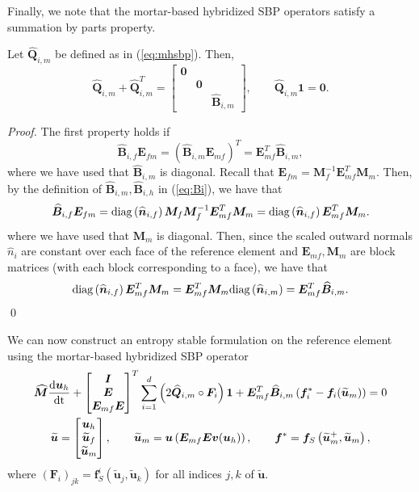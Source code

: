 \documentclass{svjour3}                     %
\renewcommand{\hat}{\widehat}
\renewcommand{\tilde}{\widetilde}
\newcommand{\diag}[1]{{\rm diag}\LRp{#1}}
\newcommand{\td}[2]{\frac{{\rm d}#1}{{\rm d}{\rm #2}}}
\newcommand{\LRp}[1]{\left( #1 \right)}
\begin{document}
Finally, we note that the mortar-based hybridized SBP operators satisfy a summation by parts property.
\begin{lemma}
\label{lemma:mhsbp}
Let $\hat{\bm{Q}}_{i,m}$ be defined as in (\ref{eq:mhsbp}).  Then, 
\[
\hat{\bm{Q}}_{i,m} + \hat{\bm{Q}}_{i,m}^T = \begin{bmatrix}
\bm{0} && \\
&\bm{0} &\\
&& \hat{\bm{B}}_{i,m}\end{bmatrix}, \qquad \hat{\bm{Q}}_{i,m}\bm{1} = \bm{0}.
\]
\end{lemma}
\begin{proof}
The first property holds if 
\begin{equation}
\hat{\bm{B}}_{i,f} \bm{E}_{fm} = (\hat{\bm{B}}_{i,m} \bm{E}_{mf})^T = \bm{E}_{mf}^T\hat{\bm{B}}_{i,m},  
\label{eq:mhsbpprop}
\end{equation}
where we have used that $\hat{\bm{B}}_{i,m}$ is diagonal.  Recall that $\bm{E}_{fm} = \bm{M}_f^{-1}\bm{E}_{mf}^T\bm{M}_m$.  
Then, by the definition of $\hat{\bm{B}}_{i,m}, \hat{\bm{B}}_{i,h}$ in (\ref{eq:Bi}), we have that
\begin{align*}
\hat{\bm{B}}_{i,f} \bm{E}_{fm} = \diag{\hat{\bm{n}}_{i,f}}\bm{M}_f \bm{M}_f^{-1} \bm{E}_{mf}^T\bm{M}_m 
= \diag{\hat{\bm{n}}_{i,f}} \bm{E}_{mf}^T\bm{M}_m.
\end{align*}
where we have used that $\bm{M}_m$ is diagonal.  Then, since the scaled outward normals $\hat{n}_i$  are constant over each face of the reference element and $\bm{E}_{mf}, \bm{M}_m$ are block matrices (with each block corresponding to a face), we have that
\[
\diag{\hat{\bm{n}}_{i,f}} \bm{E}_{mf}^T\bm{M}_m =\bm{E}_{mf}^T\bm{M}_m \diag{\hat{\bm{n}}_{i,m}}= \bm{E}_{mf}^T\hat{\bm{B}}_{i,m}.
\]  
\qed\end{proof}

We can now construct an entropy stable formulation on the reference element using the mortar-based hybridized SBP operator
\begin{gather}
\hat{\bm{M}}\td{\bm{u}_h}{t} + \begin{bmatrix} \bm{I} \\ \bm{E} \\ \bm{E}_{mf}\bm{E} \end{bmatrix}^T
\sum_{i=1}^d \LRp{2\hat{\bm{Q}}_{i,m} \circ \bm{F}_i}\bm{1} + \bm{E}_{mf}^T\hat{\bm{B}}_{i,m}\LRp{\bm{f}_i^*-\bm{f}_i(\tilde{\bm{u}}_m)} = 0 \label{eq:esdgmref}\\
\tilde{\bm{u}} = \begin{bmatrix}
\bm{u}_h\\
\tilde{\bm{u}}_f\\
\tilde{\bm{u}}_m
\end{bmatrix}, \qquad \tilde{\bm{u}}_m = \bm{u}\LRp{\bm{E}_{mf}\bm{E}\bm{v}(\bm{u}_h)}, \qquad \bm{f}^* = \bm{f}_S\LRp{\tilde{\bm{u}}_m^+,\tilde{\bm{u}}_m},
\end{gather}
where $\LRp{\bm{F}_i}_{jk} = \bm{f}^i_S\LRp{\tilde{\bm{u}}_j,\tilde{\bm{u}}_k}$ for all indices $j,k$ of $\tilde{\bm{u}}$.  
\end{document}
